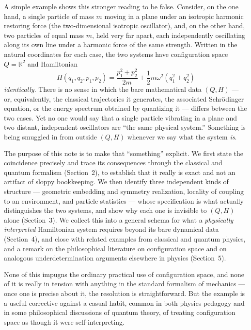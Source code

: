 \documentclass[11pt]{article}
\begin{document}
A simple example shows this stronger reading to be false. Consider, on the one hand, a single particle of mass $m$ moving in a plane under an isotropic harmonic restoring force (the two-dimensional isotropic oscillator), and, on the other hand, two particles of equal mass $m$, held very far apart, each independently oscillating along its own line under a harmonic force of the same strength. Written in the natural coordinates for each case, the two systems have configuration space $Q=\mathbb{R}^2$ and Hamiltonian
\[
H(q_1,q_2,p_1,p_2)=\frac{p_1^2+p_2^2}{2m}+\frac{1}{2}m\omega^2\left(q_1^2+q_2^2\right)
\]
\emph{identically}. There is no sense in which the bare mathematical data $(Q,H)$ --- or, equivalently, the classical trajectories it generates, the associated Schr\"odinger equation, or the energy spectrum obtained by quantizing it --- differs between the two cases. Yet no one would say that a single particle vibrating in a plane and two distant, independent oscillators are ``the same physical system.'' Something is being smuggled in from outside $(Q,H)$ whenever we say what the system \emph{is}.

The purpose of this note is to make that ``something'' explicit. We first state the coincidence precisely and trace its consequences through the classical and quantum formalism (Section~2), to establish that it really is exact and not an artifact of sloppy bookkeeping. We then identify three independent kinds of structure --- geometric embedding and symmetry realization, locality of coupling to an environment, and particle statistics --- whose specification is what actually distinguishes the two systems, and show why each one is invisible to $(Q,H)$ alone (Section~3). We collect this into a general schema for what a \emph{physically interpreted} Hamiltonian system requires beyond its bare dynamical data (Section~4), and close with related examples from classical and quantum physics, and a remark on the philosophical literature on configuration space and on analogous underdetermination arguments elsewhere in physics (Section~5).

None of this impugns the ordinary practical use of configuration space, and none of it is really in tension with anything in the standard formalism of mechanics --- once one is precise about it, the resolution is straightforward. But the example is a useful corrective against a casual habit, common in both physics pedagogy and in some philosophical discussions of quantum theory, of treating configuration space as though it were self-interpreting.
\end{document}
